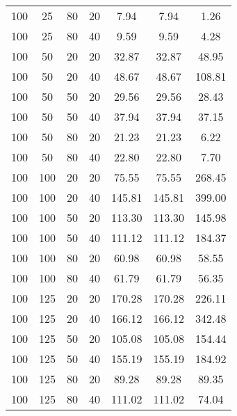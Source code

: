 \begin{tabular}{ |c|c|c|c||c|c|c| }
100 & 25 & 80 & 20 &   7.94 &   7.94 &   1.26 \\
100 & 25 & 80 & 40 &   9.59 &   9.59 &   4.28 \\
100 & 50 & 20 & 20 &  32.87 &  32.87 &  48.95 \\
100 & 50 & 20 & 40 &  48.67 &  48.67 & 108.81 \\
100 & 50 & 50 & 20 &  29.56 &  29.56 &  28.43 \\
100 & 50 & 50 & 40 &  37.94 &  37.94 &  37.15 \\
100 & 50 & 80 & 20 &  21.23 &  21.23 &   6.22 \\
100 & 50 & 80 & 40 &  22.80 &  22.80 &   7.70 \\
100 & 100 & 20 & 20 &  75.55 &  75.55 & 268.45 \\
100 & 100 & 20 & 40 & 145.81 & 145.81 & 399.00 \\
100 & 100 & 50 & 20 & 113.30 & 113.30 & 145.98 \\
100 & 100 & 50 & 40 & 111.12 & 111.12 & 184.37 \\
100 & 100 & 80 & 20 &  60.98 &  60.98 &  58.55 \\
100 & 100 & 80 & 40 &  61.79 &  61.79 &  56.35 \\
100 & 125 & 20 & 20 & 170.28 & 170.28 & 226.11 \\
100 & 125 & 20 & 40 & 166.12 & 166.12 & 342.48 \\
100 & 125 & 50 & 20 & 105.08 & 105.08 & 154.44 \\
100 & 125 & 50 & 40 & 155.19 & 155.19 & 184.92 \\
100 & 125 & 80 & 20 &  89.28 &  89.28 &  89.35 \\
100 & 125 & 80 & 40 & 111.02 & 111.02 &  74.04 \\
\hline
\end{tabular}
